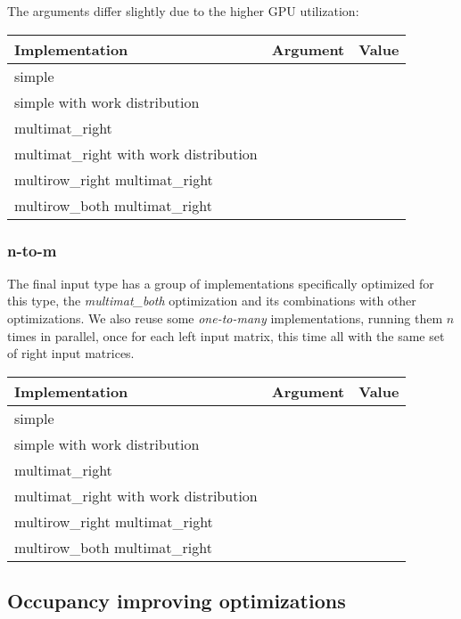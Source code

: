 The arguments differ slightly due to the higher GPU utilization:

\begin{center}
	\begin{tabular}{|l|l|c|} 
		\hline
		Implementation&Argument&Value\\ [0.5ex] 
		\hline\hline
		simple & & \\
		\hline
		simple with work distribution & & \\
		\hline
		multimat\_right & & \\
		\hline
		multimat\_right with work distribution & & \\
		\hline
		multirow\_right multimat\_right & & \\
		\hline
		multirow\_both multimat\_right & & \\
		\hline
	\end{tabular}
\end{center}


\subsubsection{n-to-m}
The final input type has a group of implementations specifically optimized for this type, the \textit{multimat\_both} optimization and its combinations with other optimizations. We also reuse some \textit{one-to-many} implementations, running them $n$ times in parallel, once for each left input matrix, this time all with the same set of right input matrices.

\begin{center}
	\begin{tabular}{|l|l|c|} 
		\hline
		Implementation&Argument&Value\\ [0.5ex] 
		\hline\hline
		simple & &  \\
		\hline
		simple with work distribution & &  \\
		\hline
		multimat\_right & & \\
		\hline
		multimat\_right with work distribution & & \\
		\hline
		multirow\_right multimat\_right & & \\
		\hline
		multirow\_both multimat\_right & & \\
		\hline
	\end{tabular}
\end{center}

\subsection{Occupancy improving optimizations}
\label{sec:results_occupancy_improvements}

